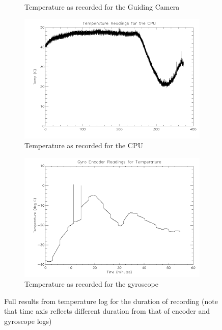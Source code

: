{\begin{figure}[htbp]
\begin{subfigure}{0.45\textwidth}
		\caption{Temperature as recorded for the Guiding Camera}
		\label{fig:sub:GCTemp}
	\end{subfigure}
	\begin{subfigure}{0.45\textwidth}
		\includegraphics[width=1\linewidth]{appendix/img/campaign_results/tempcpu.png}
		\caption{Temperature as recorded for the CPU}
		\label{fig:sub:cputemp}
	\end{subfigure}
	\begin{subfigure}{0.45\textwidth}
		\includegraphics[width=1\linewidth]{appendix/img/campaign_results/gyrotemp.png}
		\caption{Temperature as recorded for the gyroscope}
		\label{fig:sub:gyrotemp}
	\end{subfigure}	
	\caption{Full results from temperature log for the duration of recording (note that time axis reflects different duration from that of encoder and gyroscope logs)}
	\label{fig:temp}
\end{figure}

}
